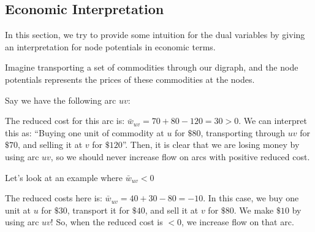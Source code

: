 \subsection{Economic Interpretation}\label{sec:tp_econ-interp}
In this section, we try to provide some intuition for the dual variables by giving an interpretation for node potentials in economic terms.

Imagine transporting a set of commodities through our digraph, and the node potentials represents the prices of these commodities at the nodes.

Say we have the following arc $uv$:

\begin{minipage}{\textwidth}
\centering
{}
\end{minipage}

The reduced cost for this arc is: $\bar{w}_{uv} = 70 + 80 - 120 = 30 > 0$. We can interpret this as: ``Buying one unit of commodity at $u$ for $\$80$, transporting through $uv$ for $\$70$, and selling it at $v$ for $\$120$''. Then, it is clear that we are losing money by using arc $uv$, so we should never increase flow on arcs with positive reduced cost.

Let's look at an example where $\bar{w}_{uv} < 0$

\begin{minipage}{\textwidth}
\centering
{}
\end{minipage}

The reduced costs here is: $\bar{w}_{uv} = 40 + 30 - 80 = -10$. In this case, we buy one unit at $u$ for $\$30$, transport it for $\$40$, and sell it at $v$ for $\$80$. We make $\$10$ by using arc $uv$! So, when the reduced cost is $<0$, we increase flow on that arc.